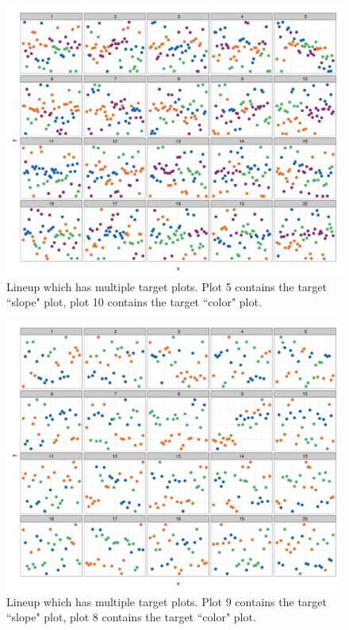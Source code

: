 \documentclass[11pt]{isuthesis}\usepackage[]{graphicx}\usepackage[]{color}
\begin{document}
\begin{figure}[htbp]\centering
\includegraphics[width=.95\textwidth]{HierarchyLineup}
\caption[Sample multi-target lineup]{Lineup which has multiple target plots. Plot 5 contains the target ``slope" plot, plot 10 contains the target ``color" plot.}\label{fig:hierarchylineup}
\end{figure}

\begin{figure}[htbp]\centering
\includegraphics[width=.95\textwidth]{HierarchyLineup2}
\caption[Another sample multi-target lineup]{Lineup which has multiple target plots. Plot 9 contains the target ``slope" plot, plot 8 contains the target ``color" plot.}\label{fig:hierarchylineup2}
\end{figure}
\end{document}
